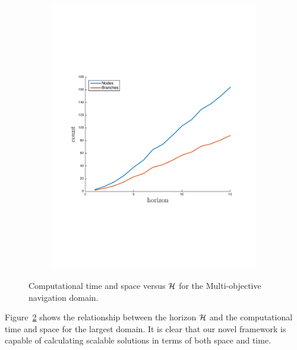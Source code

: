 \begin{figure}[h!]
\begin{subfigure}[b]{0.23\textwidth}
        \includegraphics[width=\linewidth]{images/space_plot_new}
        \label{fig:space_complexity}        
    \end{subfigure}    
    \caption{Computational time and space versus {\footnotesize $ \mathcal{H} $} for the Multi-objective navigation domain.}
    \label{fig:time_space_complexity}    
\end{figure}

Figure~\ref{fig:time_space_complexity} shows the relationship between the horizon $ \mathcal{H} $ and the computational time and space for the largest domain. It is clear that our novel framework is capable of calculating scalable solutions in terms of both space and time.

